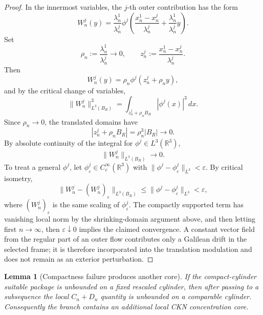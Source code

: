 \documentclass[11pt]{amsart}
\theoremstyle{plain}
\newtheorem{lemma}[theorem]{Lemma}
\theoremstyle{definition}
\theoremstyle{remark}
\begin{document}
\begin{proof}
In the innermost variables, the \(j\)-th outer contribution has the form
\[
  W^j_n(y)=\frac{\lambda^1_n}{\lambda^j_n}
  \phi^j\left(\frac{x^1_n-x^j_n}{\lambda^j_n}
  +\frac{\lambda^1_n}{\lambda^j_n}y\right).
\]
Set
\[
  \rho_n:=\frac{\lambda^1_n}{\lambda^j_n}\to0,
  \qquad
  z_n^j:=\frac{x^1_n-x^j_n}{\lambda^j_n}.
\]
Then
\[
  W^j_n(y)=\rho_n\phi^j\left(z_n^j+\rho_n y\right),
\]
and by the critical change of variables,
\[
  \|W^j_n\|_{L^3(B_R)}^3
  =\int_{z_n^j+\rho_nB_R}|\phi^j(x)|^3\,dx.
\]
Since \(\rho_n\to0\), the translated domains have
\[
  |z_n^j+\rho_nB_R|=\rho_n^3|B_R|\to0.
\]
By absolute continuity of the integral for \(\phi^j\in L^3(\mathbb R^3)\),
\[
  \|W^j_n\|_{L^3(B_R)}\to0.
\]
To treat a general \(\phi^j\), let \(\phi^j_\varepsilon\in C_c^\infty(\mathbb R^3)\) with
\(\|\phi^j-\phi^j_\varepsilon\|_{L^3}<\varepsilon\).  By critical isometry,
\[
  \|W^j_n-(W^j_n)_\varepsilon\|_{L^3(B_R)}
  \le
  \|\phi^j-\phi^j_\varepsilon\|_{L^3} < \varepsilon,
\]
where \((W^j_n)_\varepsilon\) is the same scaling of \(\phi^j_\varepsilon\).
The compactly supported term has vanishing local norm by the shrinking-domain
argument above, and then letting first \(n\to\infty\), then \(\varepsilon\downarrow0\)
implies the claimed convergence.
A constant vector field from the regular part of an outer flow contributes only
a Galilean drift in the selected frame; it is therefore incorporated into the
translation modulation and does not remain as an exterior perturbation.
\end{proof}

\begin{lemma}[Compactness failure produces another core]\label{lem:compactness-failure}
If the compact-cylinder suitable package is unbounded on a fixed rescaled
cylinder, then after passing to a subsequence the local \(C_n+D_n\) quantity is
unbounded on a comparable cylinder.  Consequently the branch contains an
additional local CKN concentration core.
\end{lemma}
\end{document}
